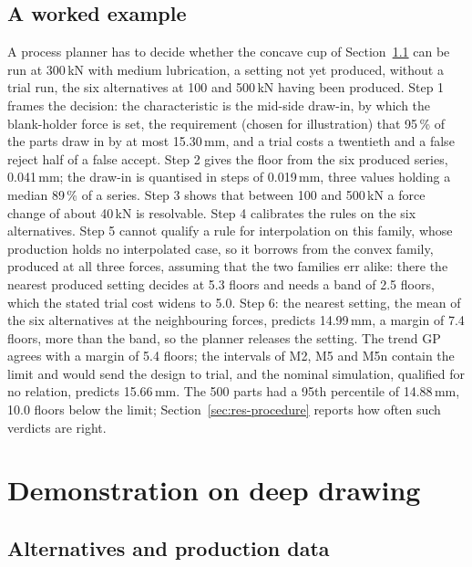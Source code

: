 \documentclass[pdflatex,sn-basic,lineno]{sn-jnl}
\begin{document}
\subsection{A worked example}\label{sec:example}

A process planner has to decide whether the concave cup of Section~\ref{sec:data} can be run at 300\,kN with medium lubrication, a setting not yet produced, without a trial run, the six alternatives at 100 and 500\,kN having been produced. Step 1 frames the decision: the characteristic is the mid-side draw-in, by which the blank-holder force is set, the requirement (chosen for illustration) that 95\,\% of the parts draw in by at most 15.30\,mm, and a trial costs a twentieth and a false reject half of a false accept. Step 2 gives the floor from the six produced series, 0.041\,mm; the draw-in is quantised in steps of 0.019\,mm, three values holding a median 89\,\% of a series. Step 3 shows that between 100 and 500\,kN a force change of about 40\,kN is resolvable. Step 4 calibrates the rules on the six alternatives. Step 5 cannot qualify a rule for interpolation on this family, whose production holds no interpolated case, so it borrows from the convex family, produced at all three forces, assuming that the two families err alike: there the nearest produced setting decides at 5.3 floors and needs a band of 2.5 floors, which the stated trial cost widens to 5.0. Step 6: the nearest setting, the mean of the six alternatives at the neighbouring forces, predicts 14.99\,mm, a margin of 7.4 floors, more than the band, so the planner releases the setting. The trend GP agrees with a margin of 5.4 floors; the intervals of M2, M5 and M5n contain the limit and would send the design to trial, and the nominal simulation, qualified for no relation, predicts 15.66\,mm. The 500 parts had a 95th percentile of 14.88\,mm, 10.0 floors below the limit; Section~\ref{sec:res-procedure} reports how often such verdicts are right.

\section{Demonstration on deep drawing}\label{sec:demo}

\subsection{Alternatives and production data}\label{sec:data}
\end{document}
